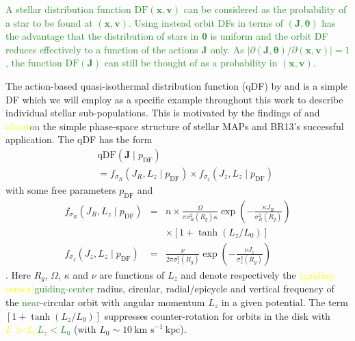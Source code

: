 \documentclass[iop,revtex4,numberedappendix,appendixfloats]{emulateapj}
\newcommand{\vect}[1]{\boldsymbol{#1}}
\newcommand{\MAPs}{MAPs}
\newcommand{\NEW}[1]{\textcolor{ForestGreen}{#1}}
\newcommand{\OLD}[1]{\textcolor{Yellow}{#1}}%
\begin{document}
\NEW{A stellar distribution function $\text{DF}(\vect{x},\vect{v})$ can be considered as the probability of a star to be found at $(\vect{x},\vect{v})$. Using instead orbit DFs in terms of $(\vect{J},\vect{\theta})$ has the advantage that the distribution of stars in $\vect{\theta}$ is uniform and the orbit DF reduces effectively to a function of the actions $\vect{J}$ only. As $\left| \partial(\vect{J},\vect{\theta}) / \partial (\vect{x},\vect{v}) \right| = 1$, the function $\text{DF}(\vect{J})$ can still be thought of as a probability in $(\vect{x},\vect{v})$.}

The action-based quasi-isothermal distribution function (qDF) by \citet{2010MNRAS.401.2318B} and \citet{2011MNRAS.413.1889B} is a simple DF which we will employ as a specific example throughout this work to describe individual stellar sub-populations. This is motivated by the findings of \citet{2012ApJ...751..131B,2012ApJ...755..115B,2012ApJ...753..148B} and \citet{2013MNRAS.434..652T} \OLD{about}\NEW{on} the simple phase-space structure of stellar \MAPs{} and BR13's successful application. The qDF has the form
\begin{eqnarray}
&&\text{qDF}(\vect{J} \mid p_\text{DF}) \nonumber\\
&&= f_{\sigma_R}\left(J_R,L_z \mid p_\text{DF}\right) \times f_{\sigma_z}\left(J_z,L_z \mid p_\text{DF}\right)\label{eq:df_general}\end{eqnarray}
with some free parameters $p_\text{DF}$ and
\begin{eqnarray}
f_{\sigma_R}\left(J_R,L_z \mid p_\text{DF}\right) &=& n \times \frac{\Omega}{\pi\sigma_R^2(R_g) \kappa}\exp\left(-\frac{\kappa J_R}{\sigma_R^2(R_g)} \right) \nonumber\\
&& \times \left[1+\tanh\left(L_z/L_0\right) \right]\\
f_{\sigma_z}\left(J_z,L_z \mid p_\text{DF} \right) &=& \frac{\nu}{2 \pi \sigma_z^2(R_g)} \exp\left( -\frac{\nu J_z}{\sigma_z^2(R_g)} \right)
\end{eqnarray}
\citep{2011MNRAS.413.1889B}. Here $R_g$, $\Omega$,  $\kappa$ and $\nu$ are functions of $L_z$ and denote respectively the \OLD{(guiding-center)}\NEW{guiding-center} radius, circular, radial/epicycle and vertical frequency of the \NEW{near-}circular orbit with angular momentum $L_z$ in a given potential. The term $\left[1+\tanh\left(L_z/L_0\right) \right]$ suppresses counter-rotation for orbits in the disk with \OLD{$L \gg L_0$}\NEW{$L_z < L_0$} (with $L_0 \sim 10~\text{km s}^{-1}~ \text{kpc}$).
\end{document}
